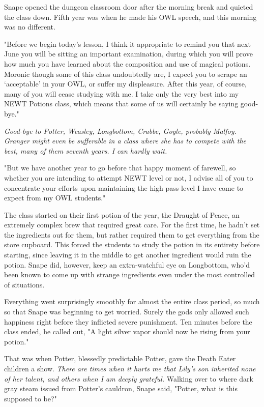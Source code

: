 Snape opened the dungeon classroom door after the morning break and quieted the class down. Fifth year was when he made his OWL speech, and this morning was no different.

"Before we begin today's lesson, I think it appropriate to remind you that next June you will be sitting an important examination, during which you will prove how much you have learned about the composition and use of magical potions. Moronic though some of this class undoubtedly are, I expect you to scrape an `acceptable' in your OWL, or suffer my displeasure. After this year, of course, many of you will cease studying with me. I take only the very best into my NEWT Potions class, which means that some of us will certainly be saying good-bye."

\emph{Good-bye to Potter, Weasley, Longbottom, Crabbe, Goyle, probably Malfoy. Granger might even be sufferable in a class where she has to compete with the best, many of them seventh years. I can hardly wait.}

"But we have another year to go before that happy moment of farewell, so whether you are intending to attempt NEWT level or not, I advise all of you to concentrate your efforts upon maintaining the high pass level I have come to expect from my OWL students."

The class started on their first potion of the year, the Draught of Peace, an extremely complex brew that required great care. For the first time, he hadn't set the ingredients out for them, but rather required them to get everything from the store cupboard. This forced the students to study the potion in its entirety before starting, since leaving it in the middle to get another ingredient would ruin the potion. Snape did, however, keep an extra-watchful eye on Longbottom, who'd been known to come up with strange ingredients even under the most controlled of situations.

Everything went surprisingly smoothly for almost the entire class period, so much so that Snape was beginning to get worried. Surely the gods only allowed such happiness right before they inflicted severe punishment. Ten minutes before the class ended, he called out, "A light silver vapor should now be rising from your potion."

That was when Potter, blessedly predictable Potter, gave the Death Eater children a show. \emph{There are times when it hurts me that Lily's son inherited none of her talent, and others when I am deeply grateful.} Walking over to where dark gray steam issued from Potter's cauldron, Snape said, "Potter, what is this supposed to be?"

